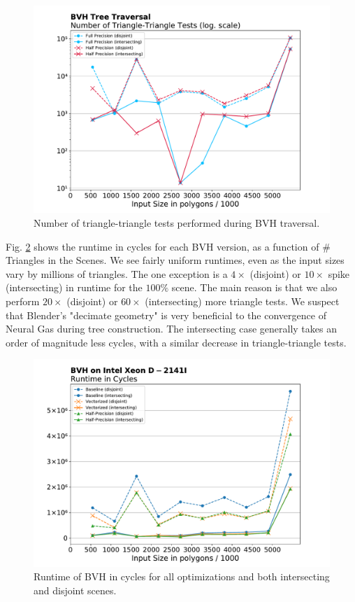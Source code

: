 \documentclass[twocolumn]{article}
\begin{document}
\begin{figure}[!ht]
\includegraphics[width=1.1\linewidth]{bvh_triangles.pdf}
\caption{Number of triangle-triangle tests performed during BVH traversal.}
\label{bvhtriangles}
\end{figure}

Fig. \ref{bvhcycles} shows the runtime in cycles for each BVH version, as a function of \# Triangles in the Scenes. 
We see fairly uniform runtimes, even as the input sizes vary by millions of triangles.
The one exception is a $4\times$ (disjoint) or $10\times$ spike (intersecting) in runtime for the $100\%$ scene.
The main reason is that we also perform $20\times$ (disjoint) or $60\times$ (intersecting) more triangle tests.
We suspect that Blender's "decimate geometry" is very beneficial to the convergence of Neural Gas during tree construction.
The intersecting case generally takes an order of magnitude less cycles, with a similar decrease in triangle-triangle tests.

\begin{figure}[!ht]
\includegraphics[width=1.1\linewidth]{bvh_cycles.pdf}
\caption{Runtime of BVH in cycles for all optimizations and both intersecting and disjoint scenes.}
\label{bvhcycles}
\end{figure}
\end{document}
